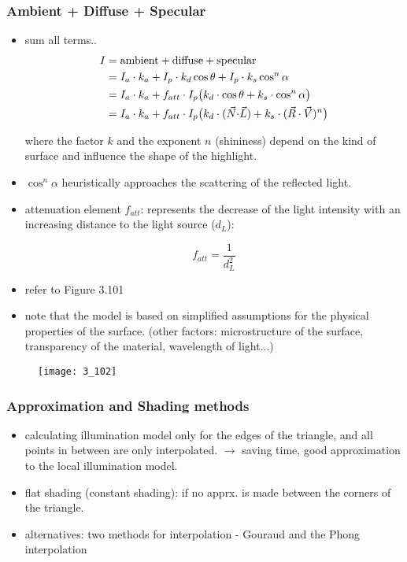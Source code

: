 \documentclass{standalone}
\begin{document}
\subsubsection*{Ambient + Diffuse + Specular}

\begin{itemize}
	\item sum all terms..
	\begin{align}
		I &= \text{ambient} + \text{diffuse} + \text{specular} \\ 
		&= I_a \cdot k_a + I_p \cdot k_d \cos{\theta} + I_p \cdot k_s \cos^n \alpha \\
		&= I_a \cdot k_a + f_{att} \cdot I_p \big(k_d \cdot \cos \theta + k_s \cdot \cos^n \alpha \big) \\
		&= I_a \cdot k_a + f_{att} \cdot I_p \big(k_d \cdot (\vec{N} \bold{\cdot} \vec{L}) + k_s \cdot (\vec{R} \cdot \vec{V})^n \big)
	\end{align}
	
	where the factor $k$ and the exponent $n$ (shininess) depend on the kind of surface and influence the shape of the highlight.
	\item $\cos ^n \alpha$ heuristically approaches the scattering of the reflected light.
	\item attenuation element $f_{att}$: represents the decrease of the light intensity with an increasing distance to the light source ($d_L$): 
	
	\begin{equation}
		f_{att} = \frac{1}{d_L^2}
	\end{equation}
	
	\item refer to Figure 3.101
	\item note that the model is based on simplified assumptions for the physical properties of the surface. (other factors: microstructure of the surface, transparency of the material, wavelength of light...)
\end{itemize}

\begin{figure}[H]
	\centering
	\texttt{[image: 3\_102]}
\end{figure}


\subsubsection*{Approximation and Shading methods}

\begin{itemize}
	\item calculating illumination model only for the edges of the triangle, and all points in between are only interpolated. $\rightarrow$ saving time, good approximation to the local illumination model.
	\item flat shading (constant shading): if no apprx. is made between the corners of the triangle.
	\item alternatives: two methods for interpolation - Gouraud and the Phong interpolation 
\end{itemize}
\end{document}
